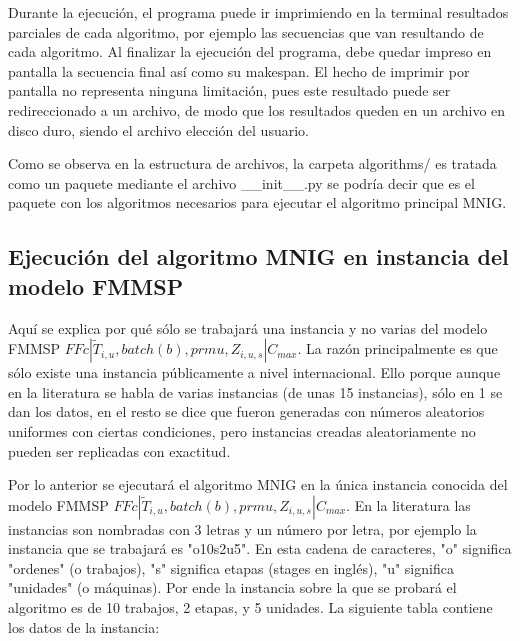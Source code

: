 \documentclass{article}
\def\notac_modelo{$FFc | \tilde{T}_{i, u}, batch(b), prmu, Z_{i, u, s} | C_{max}$}
\begin{document}
\vspace{\baselineskip}
Durante la ejecución, el programa puede ir imprimiendo en la terminal resultados parciales de cada algoritmo, por ejemplo las secuencias que van resultando de cada algoritmo. Al finalizar la ejecución del programa, debe quedar impreso en pantalla la secuencia final así como su makespan. El hecho de imprimir por pantalla no representa ninguna limitación, pues este resultado puede ser redireccionado a un archivo, de modo que los resultados queden en un archivo en disco duro, siendo el archivo elección del usuario.

\vspace{\baselineskip}
Como se observa en la estructura de archivos, la carpeta algorithms/ es tratada como un paquete mediante el archivo \_\_init\_\_.py se podría decir que es el paquete con los algoritmos necesarios para ejecutar el algoritmo principal MNIG.

\subsection{Ejecución del algoritmo MNIG en instancia del modelo FMMSP}

Aquí se explica por qué sólo se trabajará una instancia y no varias del modelo FMMSP \notac_modelo. La razón principalmente es que sólo existe una instancia públicamente a nivel internacional. Ello porque aunque en la literatura se habla de varias instancias (de unas 15 instancias), sólo en 1 se dan los datos, en el resto se dice que fueron generadas con números aleatorios uniformes con ciertas condiciones, pero instancias creadas aleatoriamente no pueden ser replicadas con exactitud. \autocite{modFMMSP}

\vspace{\baselineskip}
Por lo anterior se ejecutará el algoritmo MNIG en la única instancia conocida del modelo FMMSP \notac_modelo. En la literatura las instancias son nombradas con 3 letras y un número por letra, por ejemplo la instancia que se trabajará es "o10s2u5". En esta cadena de caracteres, "o" significa "ordenes" (o trabajos), "s" significa etapas (stages en inglés), "u" significa "unidades" (o máquinas). Por ende la instancia sobre la que se probará el algoritmo es de 10 trabajos, 2 etapas, y 5 unidades. La siguiente tabla contiene los datos de la instancia: \autocite{modFMMSP}
\end{document}
